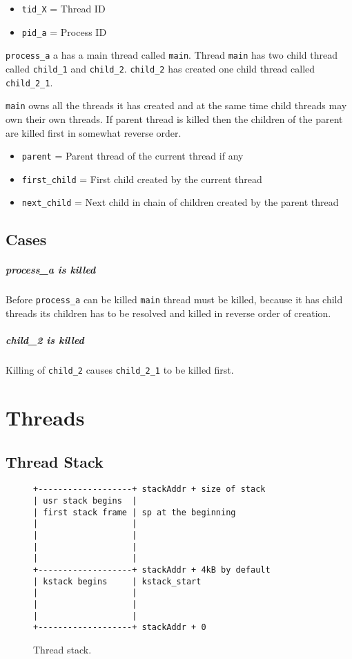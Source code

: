 \begin{itemize}
  \item \verb+tid_X+ = Thread ID
  \item \verb+pid_a+ = Process ID
\end{itemize}

\verb+process_a+ a has a main thread called \verb+main+. Thread
\verb+main+ has two child thread called \verb+child_1+ and \verb+child_2+.
\verb+child_2+ has created one child thread called \verb+child_2_1+.

\verb+main+ owns all the threads it has created and at the same time child
threads may own their own threads. If parent thread is killed then the
children of the parent are killed first in somewhat reverse order.

\begin{itemize}
  \item \verb+parent+ = Parent thread of the current thread if any
  \item \verb+first_child+ = First child created by the current thread
  \item \verb+next_child+ = Next child in chain of children created by the
        parent thread
\end{itemize}

\subsection{Cases}
\subparagraph*{process\_a is killed}

Before \verb+process_a+ can be killed \verb+main+ thread must be killed,
because it has child threads its children has to be resolved and killed in
reverse order of creation.

\subparagraph*{child\_2 is killed}

Killing of \verb+child_2+ causes \verb+child_2_1+ to be killed first.


\section{Threads}

\subsection{Thread Stack}

\begin{figure}
\begin{verbatim}
+-------------------+ stackAddr + size of stack
| usr stack begins  |
| first stack frame | sp at the beginning
|                   |
|                   |
|                   |
|                   |
+-------------------+ stackAddr + 4kB by default
| kstack begins     | kstack_start
|                   |
|                   |
|                   |
+-------------------+ stackAddr + 0
\end{verbatim}
\caption{Thread stack.}
\label{figure:thread_stack}
\end{figure}